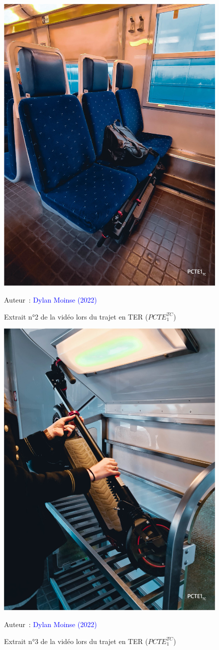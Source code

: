     \begin{figure}[h!]\vspace*{4pt}
        \caption*{Extrait n°2 de la vidéo lors du trajet en TER (\(PCTE^{TC}_{1}\))}
        \centerline{\includegraphics[width=0.5\columnwidth]{src/Figures/Annexes/Extrait_Video_PCTE1_TC_2.jpg}}
        \vspace{5pt}
        \begin{flushright}\scriptsize{
        Auteur~: \textcolor{blue}{Dylan Moinse (2022)}
        }\end{flushright}
    \end{figure}

    \begin{figure}[h!]\vspace*{4pt}
        \caption*{Extrait n°3 de la vidéo lors du trajet en TER (\(PCTE^{TC}_{1}\))}
        \centerline{\includegraphics[width=0.5\columnwidth]{src/Figures/Annexes/Extrait_Video_PCTE1_TC_3.jpg}}
        \vspace{5pt}
        \begin{flushright}\scriptsize{
        Auteur~: \textcolor{blue}{Dylan Moinse (2022)}
        }\end{flushright}
    \end{figure}

